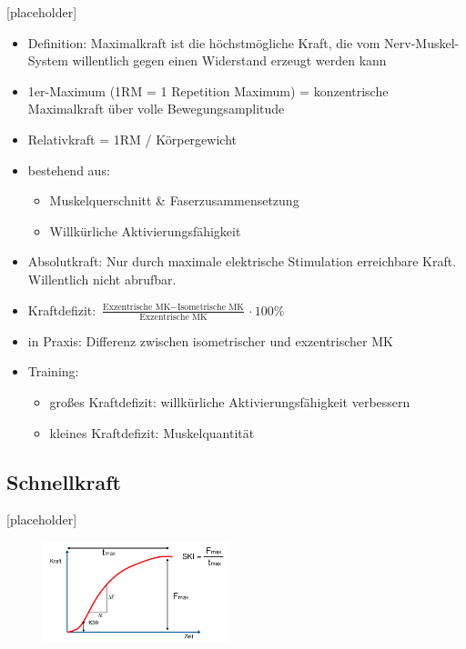 [placeholder] %

\begin{itemize}
    \item Definition: Maximalkraft ist die höchstmögliche Kraft, die vom Nerv-Muskel-System willentlich gegen einen Widerstand erzeugt werden kann
    \item 1er-Maximum (1RM = 1 Repetition Maximum) = konzentrische Maximalkraft über volle Bewegungsamplitude
    \item Relativkraft = 1RM / Körpergewicht
    \item bestehend aus:
    \begin{itemize}
        \item Muskelquerschnitt \& Faserzusammensetzung
        \item Willkürliche Aktivierungsfähigkeit
    \end{itemize}
    \item Absolutkraft: Nur durch maximale elektrische Stimulation erreichbare Kraft. Willentlich nicht abrufbar.
    \item Kraftdefizit: $\frac{\text{Exzentrische MK} - \text{Isometrische MK}}{\text{Exzentrische MK}} \cdot 100 \%$
    \item in Praxis: Differenz zwischen isometrischer und exzentrischer MK
    \item Training:
    \begin{itemize}
        \item großes Kraftdefizit: willkürliche Aktivierungsfähigkeit verbessern
        \item kleines Kraftdefizit: Muskelquantität
    \end{itemize}
\end{itemize}

\subsection{Schnellkraft}

[placeholder] %
\begin{figure}
  \begin{center}
    \includegraphics[width=0.48\textwidth]{pictures/kraftanstiegskurve}
  \end{center}
\end{figure}

